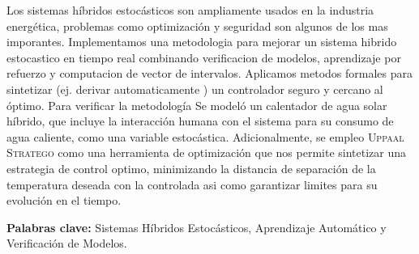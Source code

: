 \begin{resumen}


Los sistemas híbridos estocásticos son ampliamente usados en la industria
energética, problemas como optimización y seguridad son algunos de los 
mas imporantes. Implementamos una metodologia para mejorar un sistema hibrido
estocastico en tiempo real combinando verificacion de modelos, aprendizaje
por refuerzo y computacion de vector de intervalos. Aplicamos metodos formales
para sintetizar (ej. derivar automaticamente ) un controlador seguro y cercano 
al óptimo. Para verificar la metodología Se modeló un calentador de agua 
solar híbrido, que incluye 
la interacción humana con el sistema para su consumo de agua caliente, 
como una variable estocástica. Adicionalmente, se empleo \textsc{Uppaal
 Stratego} como una herramienta de optimización que nos permite sintetizar 
 una estrategia de control optimo, minimizando la distancia de separación 
 de la temperatura deseada con la controlada
asi como garantizar limites para su evolución en el tiempo.

\begin{flushleft}
\textbf{Palabras clave:} Sistemas Híbridos Estocásticos, Aprendizaje Automático y Verificación de Modelos.
\end{flushleft}

\end{resumen}
